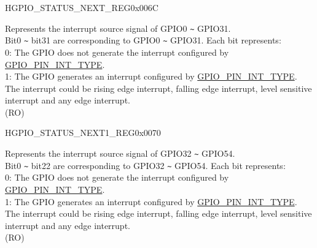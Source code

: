 \begin{register}{H}{GPIO\_STATUS\_NEXT\_REG}{0x006C}\label{regdesc:GPIOSTATUSNEXTREG}
%
\regnewline%
\begin{regdesc}\begin{reglist}
\label{fielddesc:GPIOSTATUSINTERRUPTNEXT}\item [GPIO\_STATUS\_INTERRUPT\_NEXT] Represents the interrupt source signal of GPIO0 \verb+~+ GPIO31.\\
Bit0 \verb+~+ bit31 are corresponding to GPIO0 \verb+~+ GPIO31. Each bit represents:\\
0: The GPIO does not generate the interrupt configured by \hyperref[fielddesc:GPIOPINNINTTYPE]{GPIO\_PIN\_INT\_TYPE}.\\
1: The GPIO generates an interrupt configured by \hyperref[fielddesc:GPIOPINNINTTYPE]{GPIO\_PIN\_INT\_TYPE}.\\
The interrupt could be rising edge interrupt, falling edge interrupt, level sensitive interrupt and any edge interrupt.\\  (RO)
\end{reglist}\end{regdesc}
\end{register}


\begin{register}{H}{GPIO\_STATUS\_NEXT1\_REG}{0x0070}\label{regdesc:GPIOSTATUSNEXT1REG}
%
%
\regnewline%
\begin{regdesc}\begin{reglist}
\label{fielddesc:GPIOSTATUSINTERRUPTNEXT1}\item [GPIO\_STATUS\_INTERRUPT\_NEXT1] Represents the interrupt source signal of GPIO32 \verb+~+ GPIO54.\\
Bit0 \verb+~+ bit22 are corresponding to GPIO32 \verb+~+ GPIO54. Each bit represents:\\
0: The GPIO does not generate the interrupt configured by \hyperref[fielddesc:GPIOPINNINTTYPE]{GPIO\_PIN\_INT\_TYPE}.\\
1: The GPIO generates an interrupt configured by \hyperref[fielddesc:GPIOPINNINTTYPE]{GPIO\_PIN\_INT\_TYPE}.\\
The interrupt could be rising edge interrupt, falling edge interrupt, level sensitive interrupt and any edge interrupt.\\  (RO)
\end{reglist}\end{regdesc}
\end{register}


